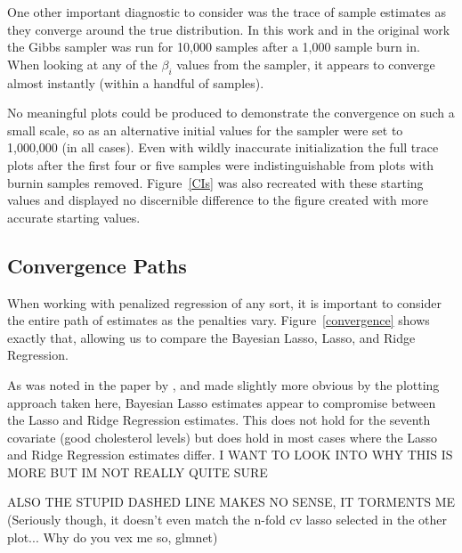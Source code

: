 \documentclass{uwstat572}
\begin{document}
One other important diagnostic to consider was the trace of sample estimates as they converge around the true distribution. In this work and in the original work the Gibbs sampler was run for 10,000 samples after a 1,000 sample burn in. When looking at any of the $\beta_i$ values from the sampler, it appears to converge almost instantly (within a handful of samples). 

No meaningful plots could be produced to demonstrate the convergence on such a small scale, so as an alternative initial values for the sampler were set to 1,000,000 (in all cases). Even with wildly inaccurate initialization the full trace plots after the first four or five samples were indistinguishable from plots with burnin samples removed. Figure~\ref{CIs} was also recreated with these starting values and displayed no discernible difference to the figure created with more accurate starting values.

\subsection{Convergence Paths}
When working with penalized regression of any sort, it is important to consider the entire path of estimates as the penalties vary. Figure~\ref{convergence} shows exactly that, allowing us to compare the Bayesian Lasso, Lasso, and Ridge Regression. 

As was noted in the paper by \cite{park2008bayesian}, and made slightly more obvious by the plotting approach taken here, Bayesian Lasso estimates appear to compromise between the Lasso and Ridge Regression estimates. This does not hold for the seventh covariate (good cholesterol levels) but does hold in most cases where the Lasso and Ridge Regression estimates differ. I WANT TO LOOK INTO WHY THIS IS MORE BUT IM NOT REALLY QUITE SURE

ALSO THE STUPID DASHED LINE MAKES NO SENSE, IT TORMENTS ME (Seriously though, it doesn't even match the n-fold cv lasso selected in the other plot... Why do you vex me so, glmnet)
\end{document}
